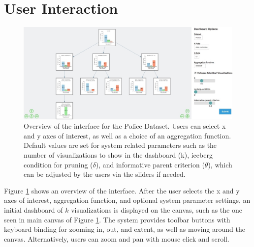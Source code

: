 \section{User Interaction\label{sec:interaction}}
\begin{figure}[ht!]
\centering
\includegraphics[width=\linewidth]{figures/overview.jpeg}
\caption{Overview of the \system interface for the Police Dataset. Users can select x and y axes of interest, as well as a choice of an aggregation function. Default values are set for system related parameters such as the number of visualizations to show in the dashboard (k), iceberg condition for pruning ($\delta$), and informative parent criterion ($\theta$), which can be adjusted by the users via the sliders if needed.}
\label{fig:overview}
\end{figure}
\par Figure \ref{fig:overview} shows an overview of the \system interface. After the user selects the x and y axes of interest, aggregation function, and optional system parameter settings, an initial dashboard of $k$ visualizations is displayed on the canvas, such as the one seen in main canvas of Figure \ref{fig:overview}.  The system provides toolbar buttons with keyboard binding for zooming in, out, and extent, as well as moving around the canvas. Alternatively, users can zoom and pan with mouse click and scroll.


